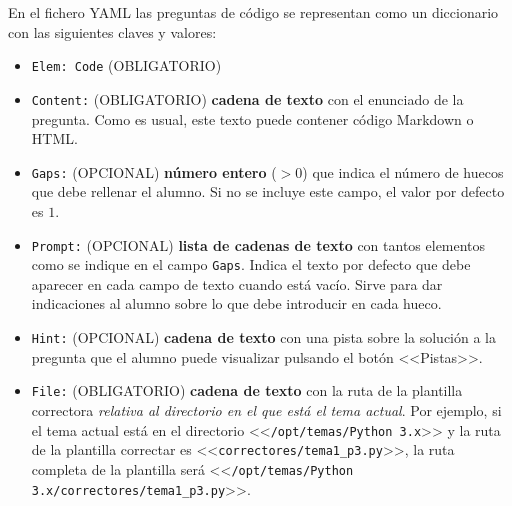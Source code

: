 \documentclass[]{article}
\newcommand{\code}[1]{{\lstinline[basicstyle=\ttfamily,mathescape]!#1!}}
\begin{document}
En el fichero YAML las preguntas de código se representan como un diccionario con las siguientes claves y valores:
\begin{itemize}
	\item \code{Elem: Code} {\sf (OBLIGATORIO)}
	\item \code{Content:} {\sf (OBLIGATORIO)} \textbf{cadena de texto} con el enunciado de la pregunta. Como es usual, este texto puede contener código Markdown o HTML. 
	\item \code{Gaps:} {\sf (OPCIONAL)} \textbf{número entero} ($> 0$) que indica el número de huecos que debe rellenar el alumno. Si no se incluye este campo, el valor por defecto es $1$.	
	\item \code{Prompt:} {\sf (OPCIONAL)} \textbf{lista de cadenas de texto} con tantos elementos como se indique en el campo \code{Gaps}. Indica el texto por defecto que debe aparecer en cada campo de texto cuando está vacío. Sirve para dar indicaciones al alumno sobre lo que debe introducir en cada hueco.
	\item \code{Hint:}  {\sf (OPCIONAL)} \textbf{cadena de texto} con una pista sobre la solución a la pregunta que el alumno puede visualizar pulsando el botón <<Pistas>>.%
	\item \code{File:} {\sf (OBLIGATORIO)} \textbf{cadena de texto} con la ruta de la plantilla correctora \emph{relativa al directorio en el que está el tema actual}. Por ejemplo, si el tema actual está en el directorio <<\code{/opt/temas/Python 3.x}>> y la ruta de la plantilla correctar es <<\code{correctores/tema1_p3.py}>>, la ruta completa de la plantilla será <<\code{/opt/temas/Python 3.x/correctores/tema1_p3.py}>>.
\end{itemize}
\end{document}
